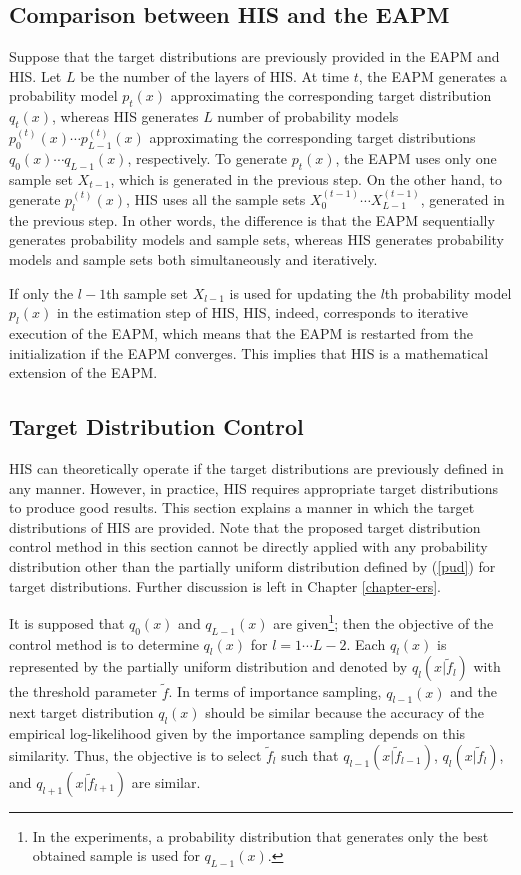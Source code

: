 \subsection{Comparison between HIS and the EAPM}
Suppose that the target distributions are previously provided in the EAPM and
HIS.
Let $L$ be the number of the layers of HIS.
At time $t$, the EAPM generates a probability model $p_t(x)$
approximating the corresponding target distribution $q_t(x)$,
whereas HIS generates 
$L$ number of probability models $p^{(t)}_0(x) \cdots p^{(t)}_{L-1}(x)$
approximating the corresponding target distributions 
$q_0(x) \cdots q_{L-1}(x)$, respectively.
To generate $p_t(x)$,
the EAPM uses only one sample set $X_{t-1}$, which is generated in the previous step.
On the other hand, to generate $p_l^{(t)}(x)$,
HIS uses all the sample sets $X_0^{(t-1)} \cdots X_{L-1}^{(t-1)}$,
generated in the previous step.
In other words, the difference is that
the EAPM sequentially generates probability models and sample sets,
whereas HIS generates probability models and sample sets
both simultaneously and iteratively.


If only the $l-1$th sample set $X_{l-1}$ is used
for updating the $l$th probability model $p_l(x)$ 
in the estimation step of HIS,
HIS, indeed, corresponds to iterative execution of the EAPM,
which means that the EAPM is restarted from the initialization
if the EAPM converges.
This implies that HIS is a mathematical extension of the EAPM.


\subsection{Target Distribution Control}
\label{sec-tdc}
HIS can theoretically operate
if the target distributions are previously defined in any manner.
However, in practice, HIS requires appropriate target distributions
to produce good results.
This section explains a manner in which 
the target distributions of HIS are provided.
Note that the proposed target distribution control method
in this section
cannot be directly applied with any probability distribution other than
 the partially uniform distribution defined by (\ref{pud}) 
for target distributions.
Further discussion is left in Chapter \ref{chapter-ers}.


It is supposed that $q_0(x)$ and $q_{L-1}(x)$ are given\footnote{
In the experiments, a probability distribution that generates only the
best obtained sample is used for $q_{L-1}(x)$.};
then the objective of the control method is
to determine $q_l(x)$ for $l=1 \cdots L-2$.
Each $q_l(x)$ is represented by the partially uniform distribution and
denoted by $q_l(x|\tilde f_l)$ 
with the threshold parameter $\tilde f$.
In terms of importance sampling,
$q_{l-1}(x)$ and the next target distribution $q_{l}(x)$ should be similar
because the accuracy of the empirical log-likelihood given by
the importance sampling depends on this similarity.
Thus, the objective is to select $\tilde f_l$ such that 
$q_{l-1}(x|\tilde f_{l-1})$, $q_l(x|\tilde f_l)$, and $q_{l+1}(x|\tilde f_{l+1})$ are similar.

